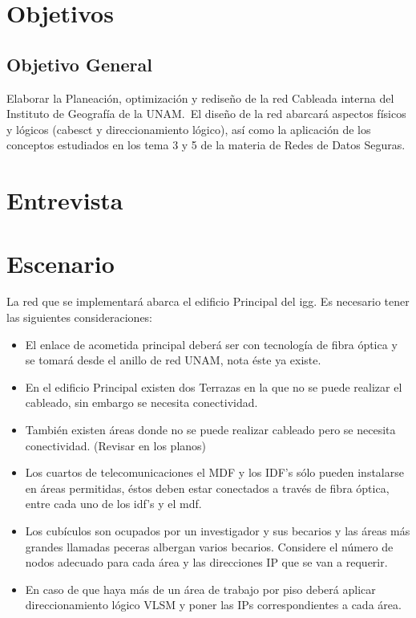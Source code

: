 \documentclass[letterpaper]{article}
\begin{document}
\section{Objetivos}\label{sec:obj}

\subsection{Objetivo General}\label{sec:objgen}

Elaborar la Planeación, optimización y rediseño de la red Cableada interna del
Instituto de Geografía de la UNAM.\ El diseño de la red abarcará aspectos físicos
y lógicos (\gls{cabesct} y direccionamiento lógico), así como la
aplicación de los conceptos estudiados en los tema 3 y 5 de la materia de Redes
de Datos Seguras.

\section{Entrevista}\label{sec:entre}



\newpage{}

\section{Escenario}\label{sec:esc}

La red que se implementará abarca el edificio Principal del \acrfull{igg}.
Es necesario tener las siguientes consideraciones:
\begin{itemize}
\item El enlace de acometida principal deberá ser con tecnología de fibra
  óptica y se tomará desde el anillo de red UNAM, nota éste ya existe.
  
\item  En el edificio Principal existen dos Terrazas en la que no se puede realizar
el cableado, sin embargo se necesita conectividad.

\item También existen áreas donde no se puede realizar cableado pero se
  necesita conectividad. (Revisar en los planos)
  
\item  Los cuartos de telecomunicaciones el MDF y los IDF’s sólo pueden
instalarse en áreas permitidas, éstos deben estar conectados a través de
fibra óptica, entre cada uno de los  \acrshort{idf}'s y el \acrshort{mdf}.\@

\item Los cubículos son ocupados por un investigador y sus becarios y las áreas
más grandes llamadas peceras albergan varios becarios. Considere el
número de nodos adecuado para cada área y las direcciones IP que se
van a requerir.

\item  En caso de que haya más de un área de trabajo por piso deberá aplicar
direccionamiento lógico VLSM y poner las IPs correspondientes a cada
área.
\end{itemize}
\end{document}
